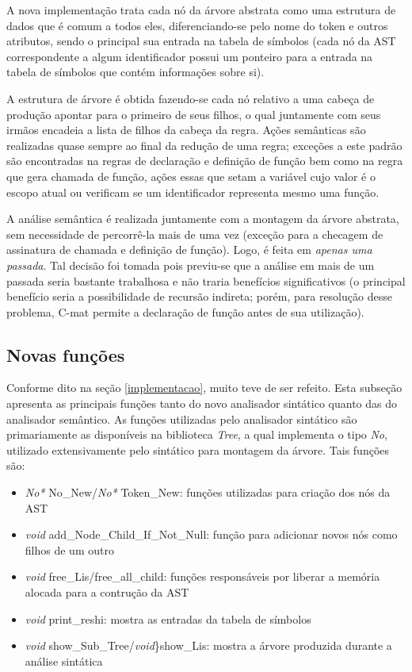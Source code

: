 \documentclass[
	article,			%
	11pt,				%
	oneside,			%
	a4paper,			%
	english,			%
	brazil,				%
	sumario=tradicional
	]{abntex2}
\renewcommand{\it}[1]{\textit{#1}}
\begin{document}
A nova implementação trata cada nó da árvore abstrata como uma estrutura de dados que é comum a todos eles, diferenciando-se pelo nome do token e outros atributos, sendo o principal sua entrada na tabela de símbolos (cada nó da AST correspondente a algum identificador possui um 
ponteiro para a entrada na tabela de símbolos que contém informações sobre si).

A estrutura de árvore é obtida fazendo-se cada nó relativo a uma cabeça de produção apontar para o primeiro de seus filhos, o qual juntamente com seus irmãos encadeia a lista de filhos da cabeça da regra. Ações semânticas são realizadas quase sempre ao final da redução de uma regra; exceções a este padrão
são encontradas na regras de declaração e definição de função bem como na regra que gera chamada de função, ações essas que setam a variável cujo valor é o escopo atual ou verificam se um
identificador representa mesmo uma função.

A análise semântica é realizada juntamente com a montagem da árvore abstrata, sem necessidade de percorrê-la mais de uma vez (exceção para a checagem de assinatura de chamada e definição de função). Logo, é feita em \it{apenas uma passada}. Tal decisão foi tomada pois previu-se que a análise em mais de um passada seria bastante trabalhosa e não traria benefícios significativos (o principal
benefício seria a possibilidade de recursão indireta; porém, para resolução desse problema, C-mat permite a declaração de função antes de sua utilização).

\subsection{Novas funções}

Conforme dito na seção \ref{implementacao}, muito teve de ser refeito. Esta subseção apresenta as principais funções tanto do novo analisador sintático quanto das do analisador semântico. As funções utilizadas pelo analisador sintático são primariamente as disponíveis na biblioteca \it{Tree}, a qual implementa o tipo \it{No}, utilizado extensivamente pelo sintático para montagem da árvore. Tais funções são:
\begin{itemize}
	\item \it{No*} No\_New/\it{No*} Token\_New: funções utilizadas para criação dos nós da AST
	\item \it{void} add\_Node\_Child\_If\_Not\_Null: função para adicionar novos nós como filhos de um outro
	\item \it{void} free\_Lis/free\_all\_child: funções responsáveis por liberar a memória alocada para a contrução da AST
	\item \it{void} print\_reshi: mostra as entradas da tabela de símbolos
	\item \it{void} show\_Sub\_Tree/\it{void}\}show\_Lis: mostra a árvore produzida durante a análise sintática
\end{itemize}
\end{document}

